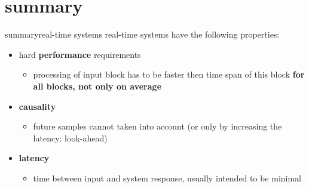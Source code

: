 \section{summary}
		\begin{frame}{summary}{real-time systems}
            real-time systems have the following properties:
            \smallskip
            \begin{itemize}
                \item   hard \textbf{performance} requirements
                    \begin{itemize}
                        \item   processing of input block has to be faster then time span of this block \textbf{for all blocks, not only on average}
                    \end{itemize}
                \smallskip
                \item   \textbf{causality}
                    \begin{itemize}
                        \item   future samples cannot taken into account (or only by increasing the latency: look-ahead)
                    \end{itemize}
                \smallskip
                \item   \textbf{latency}
                     \begin{itemize}
                        \item   time between input and system response, usually intended to be minimal
                    \end{itemize}
           \end{itemize}
 		\end{frame}



